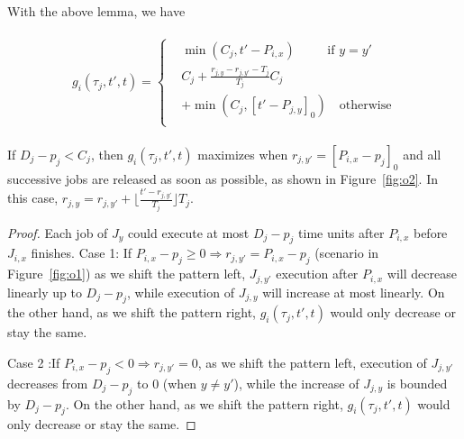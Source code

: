 With the above lemma, we have

	\begin{align}
	\begin{split}
	g_{i}(\tau_j,t',t)=
	\begin{cases}
	&\min(C_j, t'-P_{i,x})~\mbox{~~~~~~~if~} y=y'\\
	&C_j+\frac{r_{j,y}-r_{j,y'}-T_j}{T_j}C_j\\&+\min(C_j, [t'-P_{j,y}]_0)\mbox{~~~otherwise} \\
	\end{cases}
	\end{split}
	\end{align}

\begin{lemma}
If $D_j-p_j<C_j$, then $g_i(\tau_j,t',t)$ maximizes when $r_{j,y'}=[P_{i,x}-p_j]_0$ and all successive jobs are released as soon as possible,  as shown in Figure~\ref{fig:o2}. In this case, $r_{j,y}=r_{j,y'}+\lfloor \frac{t'-r_{j,y'}}{T_j}\rfloor T_j$.
\end{lemma}
\begin{proof}
Each job of $J_y$ could execute at most $D_j-p_j$ time units after $P_{i,x}$ before $J_{i,x}$ finishes.
Case 1: If $P_{i,x}-p_j\geq 0\Rightarrow r_{j,y'}=P_{i,x}-p_j$ (scenario in Figure~\ref{fig:o1}) as we shift the pattern left, $J_{j,y'}$ execution after $P_{i,x}$ will decrease linearly up to $D_j-p_j$, while  execution of $J_{j,y}$  will increase at most linearly. On the other hand, as we shift the pattern right, $g_i(\tau_j,t',t)$  would only decrease or stay the same.

Case 2 :If $P_{i,x}-p_j<0\Rightarrow r_{j,y'}=0$, as we shift the pattern left, execution of $J_{j,y'}$ decreases from $D_j-p_j$ to $0$ (when $y\neq y'$), while the increase of $J_{j,y}$ is bounded by $D_j-p_j$. On the other hand, as we shift the pattern right, $g_i(\tau_j,t',t)$  would only decrease or stay the same.
\end{proof}


